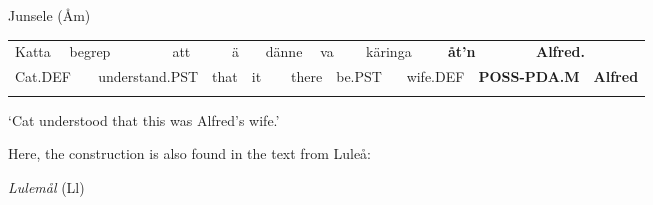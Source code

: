 \begin{listWWNumileveli}
\item {}

\begin{styleExample}
\label{bkm:Ref137369876}Junsele (Åm)

\end{styleExample}

\end{listWWNumileveli}

\begin{tabular}{llllllllllllllllll}
\lsptoprule
Katta & \multicolumn{2}{l}{begrep

} & \multicolumn{2}{l}{att

} & \multicolumn{2}{l}{ä

} & \multicolumn{2}{l}{dänne

} & \multicolumn{2}{l}{va

} & \multicolumn{2}{l}{käringa

} & \multicolumn{2}{l}{{\bfseries åt’n}

} & \multicolumn{2}{l}{{\bfseries Alfred.}

} & \\
\multicolumn{2}{l}{Cat.DEF

} & \multicolumn{2}{l}{understand.PST

} & \multicolumn{2}{l}{that

} & \multicolumn{2}{l}{it

} & \multicolumn{2}{l}{there

} & \multicolumn{2}{l}{be.PST

} & \multicolumn{2}{l}{wife.DEF

} & \multicolumn{2}{l}{{\bfseries POSS-PDA.M}

} & \multicolumn{2}{l}{{\bfseries Alfred}

}\\
\lspbottomrule
\end{tabular}

\begin{styleTranslation}
‘Cat understood that this was Alfred’s wife.’

\end{styleTranslation}

Here, the construction is also found in the text from Luleå:

\begin{listWWNumileveli}
\item {}

\begin{styleExample}
\textit{Lulemål} (Ll)

\end{styleExample}

\end{listWWNumileveli}


